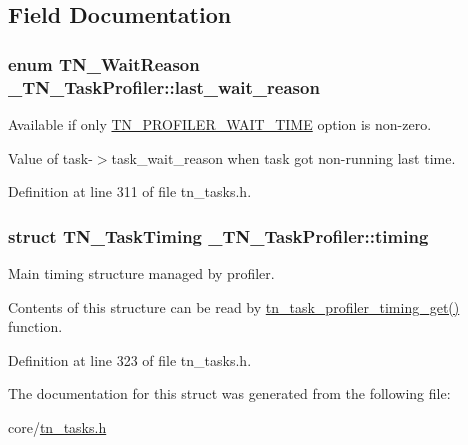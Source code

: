 \subsection{Field Documentation}
\hypertarget{struct__TN__TaskProfiler_aa587d29f8b4a5252547dc3144735ea55}{
\subsubsection[{last\+\_\+wait\+\_\+reason}]{\setlength{\rightskip}{0pt plus 5cm}enum {\bf T\+N\+\_\+\+Wait\+Reason} \+\_\+\+T\+N\+\_\+\+Task\+Profiler\+::last\+\_\+wait\+\_\+reason}}\label{struct__TN__TaskProfiler_aa587d29f8b4a5252547dc3144735ea55}


Available if only {\ttfamily \hyperlink{tn__cfg__default_8h_a1c04db5457adb54f7cc38d42b29a5ad7}{T\+N\+\_\+\+P\+R\+O\+F\+I\+L\+E\+R\+\_\+\+W\+A\+I\+T\+\_\+\+T\+I\+M\+E}} option is non-\/zero. 

Value of {\ttfamily task-\/$>$task\+\_\+wait\+\_\+reason} when task got non-\/running last time. 

Definition at line 311 of file tn\+\_\+tasks.\+h.

\hypertarget{struct__TN__TaskProfiler_a49e7b961e080414f407f5c52f9688ed5}{
\subsubsection[{timing}]{\setlength{\rightskip}{0pt plus 5cm}struct {\bf T\+N\+\_\+\+Task\+Timing} \+\_\+\+T\+N\+\_\+\+Task\+Profiler\+::timing}}\label{struct__TN__TaskProfiler_a49e7b961e080414f407f5c52f9688ed5}


Main timing structure managed by profiler. 

Contents of this structure can be read by {\ttfamily \hyperlink{tn__tasks_8h_a8f90a88f54d2d49bb1de00886241edfe}{tn\+\_\+task\+\_\+profiler\+\_\+timing\+\_\+get()}} function. 

Definition at line 323 of file tn\+\_\+tasks.\+h.



The documentation for this struct was generated from the following file\+:\begin{DoxyCompactItemize}
\item 
core/\hyperlink{tn__tasks_8h}{tn\+\_\+tasks.\+h}\end{DoxyCompactItemize}
